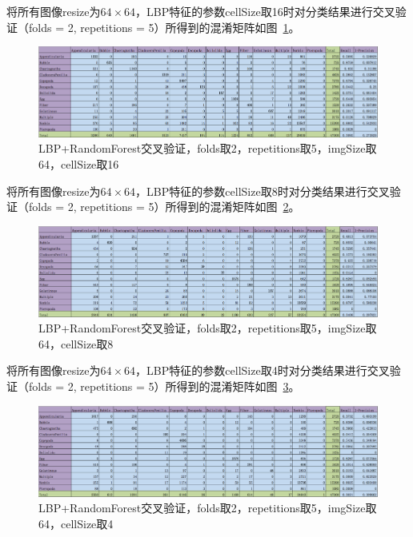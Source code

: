 \documentclass[12pt]{article}
\begin{document}
将所有图像resize为$64 \times 64$，LBP特征的参数cellSize取16时对分类结果进行交叉验证（folds = 2, repetitions = 5）所得到的混淆矩阵如图~\ref{fig: LBP-RF-2-folds-5-repetitions-16-64}。
\begin{figure}[!ht]
\centering
\includegraphics[width=1.0\linewidth]{LBP-RF-2-folds-5-repetitions-16-64}
\caption{LBP+RandomForest交叉验证，folds取2，repetitions取5，imgSize取64，cellSize取16}
\label{fig: LBP-RF-2-folds-5-repetitions-16-64}
\end{figure}

将所有图像resize为$64 \times 64$，LBP特征的参数cellSize取8时对分类结果进行交叉验证（folds = 2, repetitions = 5）所得到的混淆矩阵如图~\ref{fig: LBP-RF-2-folds-5-repetitions-8-64}。
\begin{figure}[!ht]
\centering
\includegraphics[width=1.0\linewidth]{LBP-RF-2-folds-5-repetitions-8-64}
\caption{LBP+RandomForest交叉验证，folds取2，repetitions取5，imgSize取64，cellSize取8}
\label{fig: LBP-RF-2-folds-5-repetitions-8-64}
\end{figure}

将所有图像resize为$64 \times 64$，LBP特征的参数cellSize取4时对分类结果进行交叉验证（folds = 2, repetitions = 5）所得到的混淆矩阵如图~\ref{fig: LBP-RF-2-folds-5-repetitions-4-64}。
\begin{figure}[!ht]
\centering
\includegraphics[width=1.0\linewidth]{LBP-RF-2-folds-5-repetitions-4-64}
\caption{LBP+RandomForest交叉验证，folds取2，repetitions取5，imgSize取64，cellSize取4}
\label{fig: LBP-RF-2-folds-5-repetitions-4-64}
\end{figure}
\end{document}
